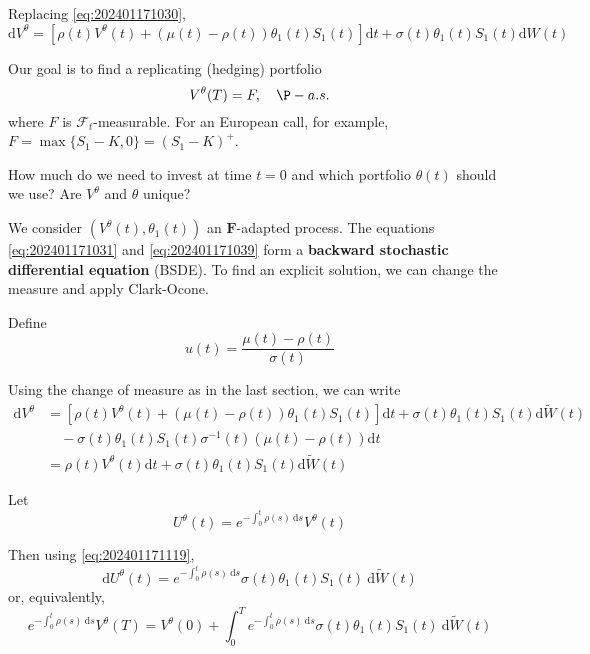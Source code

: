 Replacing \eqref{eq:202401171030},
\begin{equation}
\mathrm{d} V^\theta = [\rho(t)V^\theta(t) + (\mu(t) - \rho(t))\theta_1(t) S_1(t)] \mathrm{d} t + \sigma(t) \theta_1(t) S_1(t) \mathrm{d} W(t)
\end{equation}

Our goal is to find a replicating (hedging) portfolio
\begin{equation}\label{eq:202401171039}
V^\theta(T) = F, \quad \P-a.s.
\end{equation}
where $F$ is $\mathcal{F}_t$-measurable. For an European call, for example, $F = \max \{ S_1 - K, 0 \} = (S_1 - K)^+$. 

How much do we need to invest at time $t = 0$ and which portfolio $\theta(t)$ should we use? Are $V^\theta$ and $\theta$ unique?

We consider $(V^\theta(t), \theta_1(t))$ an $\mathbf{F}$-adapted process. The equations \eqref{eq:202401171031} and \eqref{eq:202401171039} form a \textbf{backward stochastic differential equation} (BSDE). To find an explicit solution, we can change the measure and apply Clark-Ocone.

Define 
\begin{equation}\label{eq:202401171041}
u(t) = \frac{\mu(t) - \rho(t)}{\sigma(t)}
\end{equation}

Using the change of measure as in the last section, we can write
\begin{equation}\label{eq:202401171119}
\begin{aligned}
\mathrm{d} V^\theta &= [\rho(t)V^\theta(t) + (\mu(t) - \rho(t))\theta_1(t) S_1(t)] \mathrm{d} t + \sigma(t) \theta_1(t) S_1(t) \mathrm{d} \widetilde{W}(t) \\
&\quad - \sigma(t) \theta_1(t) S_1(t) \sigma^{-1}(t) (\mu(t) - \rho(t)) \mathrm{d} t \\
&= \rho(t)V^\theta(t) \mathrm{d} t + \sigma(t) \theta_1(t) S_1(t) \mathrm{d} \widetilde{W}(t)
\end{aligned}
\end{equation}

Let
\[
U^\theta(t) = e^{-\int_0^t \rho(s) ~\mathrm{d}s} V^\theta(t)
\]

Then using \eqref{eq:202401171119},
\[
\mathrm{d} U^\theta(t) = e^{-\int_0^t \rho(s) ~\mathrm{d}s} \sigma(t) \theta_1(t) S_1(t) ~\mathrm{d}\widetilde{W}(t)
\]
or, equivalently, 
\begin{equation}\label{eq:202401171137}
e^{-\int_0^t \rho(s) ~\mathrm{d}s} V^\theta(T) = V^\theta(0) + \int_0^T e^{-\int_0^t \rho(s) ~\mathrm{d}s} \sigma(t) \theta_1(t) S_1(t) ~\mathrm{d}\widetilde{W}(t)
\end{equation}

